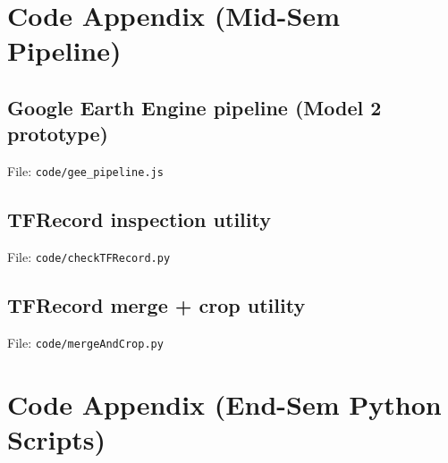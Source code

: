 \documentclass[12pt,a4paper]{report}
\begin{document}
\appendix
\renewcommand{\thechapter}{A\arabic{chapter}}
\setcounter{chapter}{0}

\chapter{Code Appendix (Mid-Sem Pipeline)}
\section{Google Earth Engine pipeline (Model 2 prototype)}
\begin{wiseNote}
File: \texttt{code/gee\_pipeline.js}
\end{wiseNote}
\lstset{style=wise,language=Java}


\section{TFRecord inspection utility}
\begin{wiseNote}
File: \texttt{code/checkTFRecord.py}
\end{wiseNote}
\lstset{style=wise,language=Python}


\section{TFRecord merge + crop utility}
\begin{wiseNote}
File: \texttt{code/mergeAndCrop.py}
\end{wiseNote}
\lstset{style=wise,language=Python}


\chapter{Code Appendix (End-Sem Python Scripts)}
\end{document}
